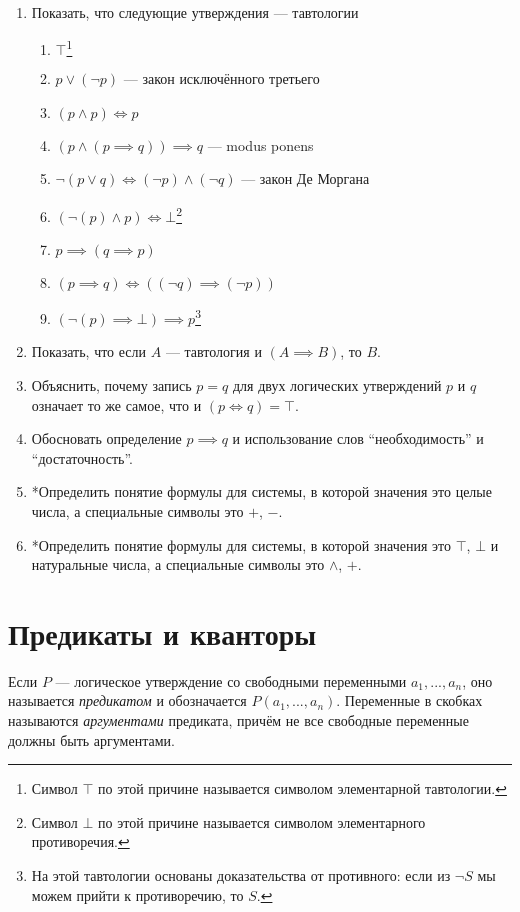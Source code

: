 \begin{enumerate}
	\item{}Показать, что следующие утверждения --- тавтологии
	\begin{enumerate}
		\item{}$\top$\footnote{Символ $\top$ по этой причине называется
			символом элементарной тавтологии.}
		\item{}$p\lor (\lnot p)$ --- закон исключённого третьего
		\item{}$(p\land p)\iff p$
		\item{}$(p\land (p\implies q))\implies q$ --- modus ponens
		\item{}$\lnot(p\lor q)\iff (\lnot p)\land (\lnot q)$ --- закон Де Моргана
		\item{}$(\lnot(p)\land p)\iff\bot$\footnote{Символ $\bot$ по этой причине называется
			символом элементарного противоречия.}
		\item{}$p\implies (q\implies p)$
		\item{}${(p\implies q)\iff ((\lnot q)\implies (\lnot p))}$
		\item{}$(\lnot(p)\implies\bot)\implies p$\footnote{На этой тавтологии основаны
			доказательства от противного: если из $\lnot S$ мы можем прийти
			к противоречию, то $S$.}
	\end{enumerate}
	\item{}Показать, что если $A$ --- тавтология и $(A\implies B)$, то $B$.
	\item{}Объяснить, почему запись $p=q$ для двух логических утверждений $p$ и $q$
	означает то же самое, что и $(p\iff q)=\top$.
	\item{}\label{ex:imply_def}Обосновать определение ${p\implies q}$ и использование
	слов ``необходимость'' и ``достаточность''.
	\item{}*Определить понятие формулы для системы, в которой значения это целые числа,
	а специальные символы это $+$, $-$.
	\item{}*Определить понятие формулы для системы, в которой значения это $\top$, $\bot$
	и натуральные числа, а специальные символы это $\land$,  $+$.
\end{enumerate}

\section{Предикаты и кванторы}

Если $P$ --- логическое утверждение со свободными переменными $a_1,...,a_{n}$,
оно называется {\it предикатом} и обозначается $P(a_1,...,a_{n})$. Переменные
в скобках называются {\it аргументами} предиката, причём не все свободные
переменные должны быть аргументами.

